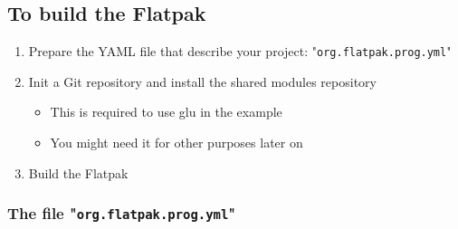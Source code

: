 \subsection{To build the Flatpak}

\begin{enumerate}
\item Prepare the YAML file that describe your project: "\texttt{org.flatpak.prog.yml}"
\item Init a Git repository and install the shared modules repository
\begin{itemize}
\item This is required to use glu in the example
\item You might need it for other purposes later on
\end{itemize}
\item Build the Flatpak
\end{enumerate}

\subsubsection{The file "\texttt{org.flatpak.prog.yml}"}

